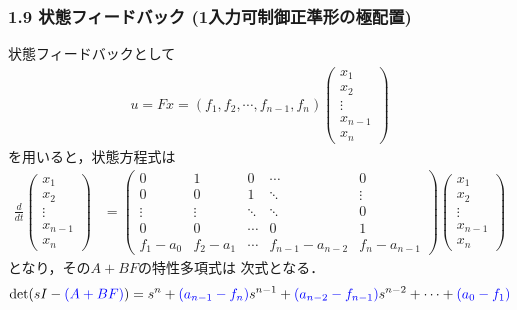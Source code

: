 \documentclass[10pt]{beamer}
\begin{document}
\begin{frame}[t]
\frametitle{1.9 状態フィードバック (1入力可制御正準形の極配置)}
状態フィードバックとして
\small{
\begin{align}
 u = F x =
 (f_1, f_2, \cdots, f_{n-1}, f_{n})
 \left(\begin{array}{c}
        x_1 \\
    x_2 \\
    \vdots \\
    x_{n-1} \\
    x_n
       \end{array}\right)
\end{align}
}
を用いると，状態方程式は
\small{
\begin{align}
 \frac{d}{dt}
  \left(\begin{array}{c}
         x_1 \\
   x_2 \\
   \vdots \\
   x_{n-1} \\
   x_n
  \end{array}\right)
  &=
  \left(\begin{array}{ccccc}
     0      & 1      & 0      & \cdots & 0 \\
   0      & 0      & 1      & \ddots & \vdots \\
   \vdots & \vdots & \ddots & \ddots & 0 \\
   0      & 0      & \cdots & 0      & 1 \\
   f_1-a_0   & f_2 -a_1   & \cdots & f_{n-1} -a_{n-2} & f_{n} -a_{n-1}
  \end{array}\right)
  \left(\begin{array}{c}
   x_1 \\
   x_2 \\
   \vdots \\
   x_{n-1} \\
   x_n
  \end{array}\right)
\end{align}
}
となり，その$A+BF$の特性多項式は
次式となる．
\begin{equation}
 \operatorname{det} (sI-\textcolor{blue}{(A+BF)}) = s^n + \textcolor{blue}{(a_{n-1}-f_n)} s^{n-1}
  + \textcolor{blue}{(a_{n-2}-f_{n-1})} s^{n-2} + \cdots 
  + \textcolor{blue}{(a_0-f_1)}

\end{equation}
\end{frame}
\end{document}
